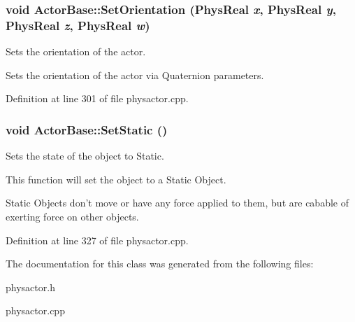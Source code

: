 \hypertarget{classActorBase_a9777506815a9840552b30c65d5d70f8d}{
\subsubsection[{SetOrientation}]{\setlength{\rightskip}{0pt plus 5cm}void ActorBase::SetOrientation (PhysReal {\em x}, \/  PhysReal {\em y}, \/  PhysReal {\em z}, \/  PhysReal {\em w})}}
\label{dd/d7b/classActorBase_a9777506815a9840552b30c65d5d70f8d}


Sets the orientation of the actor. 

Sets the orientation of the actor via Quaternion parameters. 

Definition at line 301 of file physactor.cpp.

\hypertarget{classActorBase_a97f55e5fff5d69483ebb0b9042a50bb0}{
\subsubsection[{SetStatic}]{\setlength{\rightskip}{0pt plus 5cm}void ActorBase::SetStatic ()}}
\label{dd/d7b/classActorBase_a97f55e5fff5d69483ebb0b9042a50bb0}


Sets the state of the object to Static. 

This function will set the object to a Static Object. \par
 Static Objects don't move or have any force applied to them, but are cabable of exerting force on other objects. 

Definition at line 327 of file physactor.cpp.



The documentation for this class was generated from the following files:\begin{DoxyCompactItemize}
\item 
physactor.h\item 
physactor.cpp\end{DoxyCompactItemize}
